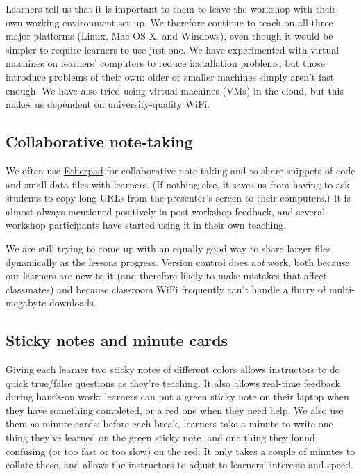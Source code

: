 \documentclass[10pt,a4paper,twocolumn]{article}
\begin{document}
Learners tell us that it is important to them to leave the workshop
with their own working environment set up. We therefore continue to
teach on all three major platforms (Linux, Mac OS X, and Windows),
even though it would be simpler to require learners to use just
one. We have experimented with virtual machines on learners' computers
to reduce installation problems, but those introduce problems of their
own: older or smaller machines simply aren't fast enough.  We have
also tried using virtual machines (VMs) in the cloud, but this makes
us dependent on university-quality WiFi.

\subsection*{Collaborative note-taking}

We often use \href{http://etherpad.org}{Etherpad} for collaborative
note-taking and to share snippets of code and small data files with
learners. (If nothing else, it saves us from having to ask students to
copy long URLs from the presenter's screen to their computers.) It is
almost always mentioned positively in post-workshop feedback, and
several workshop participants have started using it in their own
teaching.

We are still trying to come up with an equally good way to share
larger files dynamically as the lessons progress.  Version control
does \emph{not} work, both because our learners are new to it (and
therefore likely to make mistakes that affect classmates) and because
classroom WiFi frequently can't handle a flurry of multi-megabyte
downloads.

\subsection*{Sticky notes and minute cards}

Giving each learner two sticky notes of different colors allows
instructors to do quick true/false questions as they're teaching. It
also allows real-time feedback during hands-on work: learners can put
a green sticky note on their laptop when they have something
completed, or a red one when they need help. We also use them as
minute cards: before each break, learners take a minute to write one
thing they've learned on the green sticky note, and one thing they
found confusing (or too fast or too slow) on the red. It only takes a
couple of minutes to collate these, and allows the instructors to
adjust to learners' interests and speed.
\end{document}

